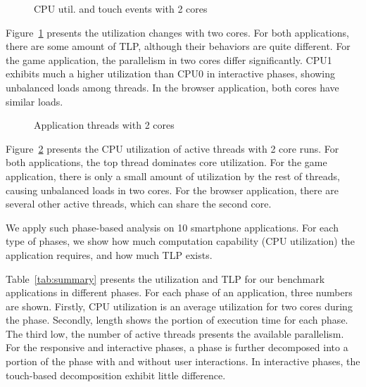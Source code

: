 \begin{figure}[bt]
\begin{center}
\vspace{-0.45in}
\vspace{0.01in}
\end{center}
\caption{CPU util. and touch events with 2 cores}
\vspace{-0.2in}
\label{fig:interact_util_2cpu}
\end{figure}

Figure~\ref{fig:interact_util_2cpu} presents the utilization changes with two cores.
For both applications, there are some amount of TLP, although their behaviors are 
quite different. For the game application, the parallelism in two cores differ significantly.
CPU1 exhibits much a higher utilization than CPU0 in interactive phases, showing unbalanced
loads among threads. In the browser application, both cores have similar loads.


\begin{figure}[bt]
\begin{center}
\vspace{-0.45in}
\vspace{0.01in}
\end{center}
\caption{Application threads with 2 cores}
\label{fig:threads}
\end{figure}

Figure~\ref{fig:threads} presents the CPU utilization of active threads with 2 core runs.
For both applications, the top thread dominates core utilization. For the game application,
there is only a small amount of utilization by the rest of threads, causing unbalanced loads
in two cores. For the browser application, there are several other active threads, which
can share the second core.

We apply such phase-based analysis on 10 smartphone applications. For each type of phases,
we show how much computation capability (CPU utilization) the application requires, and how 
much TLP exists.



Table~\ref{tab:summary} presents the utilization and TLP for our benchmark applications in
different phases. For each phase of an application, three numbers are shown. Firstly,
CPU utilization is an average utilization for two cores during the phase. Secondly, 
length shows the portion of execution time for each phase. The third low, the number of
active threads presents the available parallelism. For the responsive and interactive 
phases, a phase is further decomposed into a portion of the phase with and without 
user interactions. In interactive phases, the touch-based decomposition exhibit little difference.

